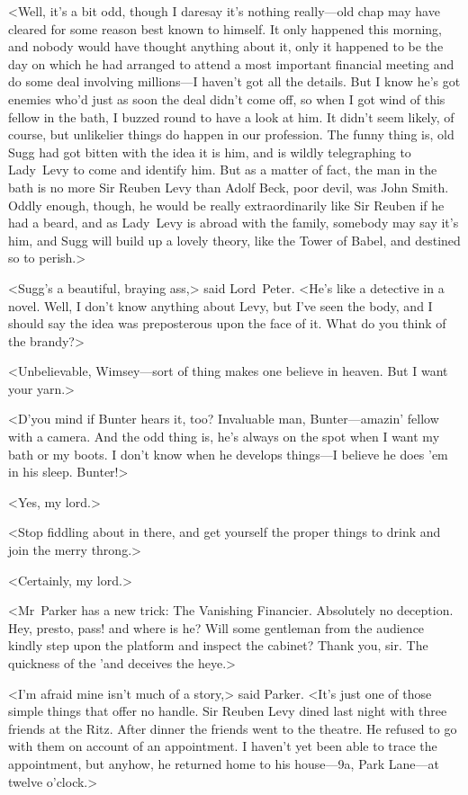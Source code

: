 <Well, it's a bit odd, though I daresay it's nothing really—old chap may have cleared for some reason best known to himself. It only happened this morning, and nobody would have thought anything about it, only it happened to be the day on which he had arranged to attend a most important financial meeting and do some deal involving millions—I haven't got all the details. But I know he's got enemies who'd just as soon the deal didn't come off, so when I got wind of this fellow in the bath, I buzzed round to have a look at him. It didn't seem likely, of course, but unlikelier things do happen in our profession. The funny thing is, old Sugg had got bitten with the idea it is him, and is wildly telegraphing to Lady~Levy to come and identify him. But as a matter of fact, the man in the bath is no more Sir Reuben Levy than Adolf Beck, poor devil, was John Smith. Oddly enough, though, he would be really extraordinarily like Sir Reuben if he had a beard, and as Lady~Levy is abroad with the family, somebody may say it's him, and Sugg will build up a lovely theory, like the Tower of Babel, and destined so to perish.>

<Sugg's a beautiful, braying ass,> said Lord~Peter. <He's like a detective in a novel. Well, I don't know anything about Levy, but I've seen the body, and I should say the idea was preposterous upon the face of it. What do you think of the brandy?>

<Unbelievable, Wimsey—sort of thing makes one believe in heaven. But I want your yarn.>

<D'you mind if Bunter hears it, too? Invaluable man, Bunter—amazin' fellow with a camera. And the odd thing is, he's always on the spot when I want my bath or my boots. I don't know when he develops things—I believe he does 'em in his sleep. Bunter!>

<Yes, my lord.>

<Stop fiddling about in there, and get yourself the proper things to drink and join the merry throng.>

<Certainly, my lord.>

<Mr~Parker has a new trick: The Vanishing Financier. Absolutely no deception. Hey, presto, pass! and where is he? Will some gentleman from the audience kindly step upon the platform and inspect the cabinet? Thank you, sir. The quickness of the 'and deceives the heye.>

<I'm afraid mine isn't much of a story,> said Parker. <It's just one of those simple things that offer no handle. Sir Reuben Levy dined last night with three friends at the Ritz. After dinner the friends went to the theatre. He refused to go with them on account of an appointment. I haven't yet been able to trace the appointment, but anyhow, he returned home to his house—9a, Park Lane—at twelve o'clock.>

